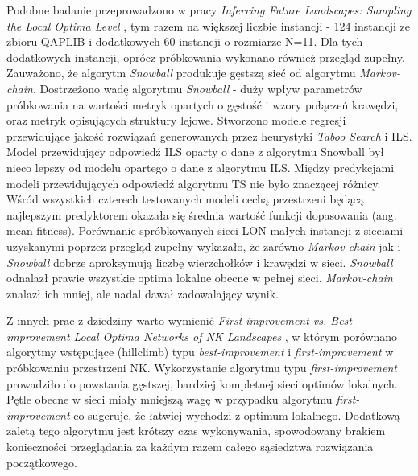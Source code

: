 Podobne badanie przeprowadzono w pracy \textit{Inferring Future Landscapes: Sampling the Local Optima Level} \cite{DBLP:journals/ec/ThomsonOVV20}, tym razem na większej liczbie instancji
- 124 instancji ze zbioru QAPLIB i dodatkowych 60 instancji o rozmiarze N=11.
Dla tych dodatkowych instancji, oprócz próbkowania wykonano również przegląd zupełny.
Zauważono, że algorytm \textit{Snowball} produkuje gęstszą sieć od algorytmu \textit{Markov-chain}.
Dostrzeżono wadę algorytmu \textit{Snowball} - duży wpływ parametrów próbkowania na wartości metryk opartych o gęstość
i wzory połączeń krawędzi, oraz metryk opisujących struktury lejowe.
Stworzono modele regresji przewidujące jakość rozwiązań generowanych przez heurystyki \textit{Taboo Search} i ILS.
Model przewidujący odpowiedź ILS oparty o dane z algorytmu Snowball był nieco lepszy od modelu opartego o dane z algorytmu ILS.
Między predykcjami modeli przewidujących odpowiedź algorytmu TS nie było znaczącej różnicy.
Wśród wszystkich czterech testowanych modeli cechą przestrzeni będącą najlepszym predyktorem okazała się średnia wartość
funkcji dopasowania (ang. mean fitness).
Porównanie spróbkowanych sieci LON małych instancji z sieciami uzyskanymi
poprzez przegląd zupełny wykazało, że zarówno \textit{Markov-chain} jak i \textit{Snowball}
dobrze aproksymują liczbę wierzchołków i krawędzi w sieci.
\textit{Snowball} odnalazł prawie wszystkie optima lokalne obecne w pełnej sieci.
\textit{Markov-chain} znalazł ich mniej, ale nadal dawał zadowalający wynik.

Z innych prac z dziedziny warto wymienić \textit{First-improvement vs. Best-improvement Local Optima Networks of NK Landscapes} \cite{DBLP:journals/corr/abs-1207-4455}, w którym porównano algorytmy wstępujące (hillclimb)
typu \textit{best-improvement} i \textit{first-improvement} w próbkowaniu przestrzeni NK.
Wykorzystanie algorytmu typu \textit{first-improvement} prowadziło do powstania gęstszej, bardziej kompletnej sieci optimów lokalnych.
Pętle obecne w sieci miały mniejszą wagę w przypadku algorytmu \textit{first-improvement} co sugeruje, że łatwiej wychodzi z optimum lokalnego.
Dodatkową zaletą tego algorytmu jest krótszy czas wykonywania, spowodowany brakiem konieczności przeglądania za każdym razem całego sąsiedztwa
rozwiązania początkowego.


